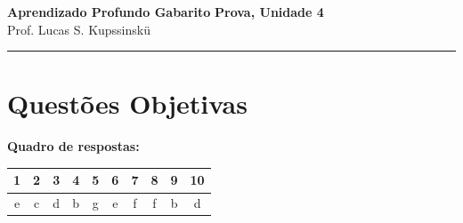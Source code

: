 \documentclass[11pt,a4paper]{article}
\begin{document}
{\Large\bfseries Aprendizado Profundo \textemdash{} Gabarito} \hfill \textbf{Prova, Unidade 4}\\
Prof. Lucas S. Kupssinskü

\rule{\linewidth}{0.8pt}

\section*{Questões Objetivas}

\textbf{Quadro de respostas:}
\begin{center}
\begin{tabular}{|c|c|c|c|c|c|c|c|c|c|}
\hline
1 & 2 & 3 & 4 & 5 & 6 & 7 & 8 & 9 & 10 \\\hline
e & c & d & b & g & e & f & f & b & d \\\hline
\end{tabular}
\end{center}

\color{blue}
\end{document}

